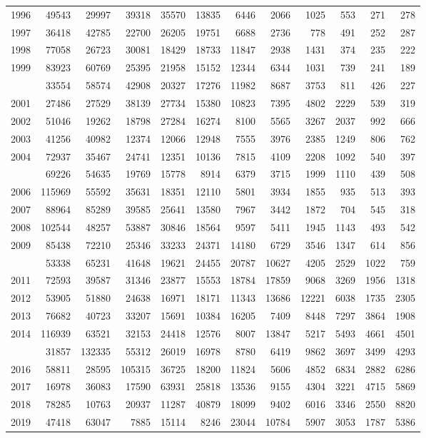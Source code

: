 \documentclass[
]{article}
\begin{document}
\begin{longtable}[t]{lrrrrrrrrrrr}
1996 & 49543 & 29997 & 39318 & 35570 & 13835 & 6446 & 2066 & 1025 & 553 & 271 & 278\\
1997 & 36418 & 42785 & 22700 & 26205 & 19751 & 6688 & 2736 & 778 & 491 & 252 & 287\\
1998 & 77058 & 26723 & 30081 & 18429 & 18733 & 11847 & 2938 & 1431 & 374 & 235 & 222\\
1999 & 83923 & 60769 & 25395 & 21958 & 15152 & 12344 & 6344 & 1031 & 739 & 241 & 189\\
\addlinespace
2000 & 33554 & 58574 & 42908 & 20327 & 17276 & 11982 & 8687 & 3753 & 811 & 426 & 227\\
2001 & 27486 & 27529 & 38139 & 27734 & 15380 & 10823 & 7395 & 4802 & 2229 & 539 & 319\\
2002 & 51046 & 19262 & 18798 & 27284 & 16274 & 8100 & 5565 & 3267 & 2037 & 992 & 666\\
2003 & 41256 & 40982 & 12374 & 12066 & 12948 & 7555 & 3976 & 2385 & 1249 & 806 & 762\\
2004 & 72937 & 35467 & 24741 & 12351 & 10136 & 7815 & 4109 & 2208 & 1092 & 540 & 397\\
\addlinespace
2005 & 69226 & 54635 & 19769 & 15778 & 8914 & 6379 & 3715 & 1999 & 1110 & 439 & 508\\
2006 & 115969 & 55592 & 35631 & 18351 & 12110 & 5801 & 3934 & 1855 & 935 & 513 & 393\\
2007 & 88964 & 85289 & 39585 & 25641 & 13580 & 7967 & 3442 & 1872 & 704 & 545 & 318\\
2008 & 102544 & 48257 & 53887 & 30846 & 18564 & 9597 & 5411 & 1945 & 1143 & 493 & 542\\
2009 & 85438 & 72210 & 25346 & 33233 & 24371 & 14180 & 6729 & 3546 & 1347 & 614 & 856\\
\addlinespace
2010 & 53338 & 65231 & 41648 & 19621 & 24455 & 20787 & 10627 & 4205 & 2529 & 1022 & 759\\
2011 & 72593 & 39587 & 31346 & 23877 & 15553 & 18784 & 17859 & 9068 & 3269 & 1956 & 1318\\
2012 & 53905 & 51880 & 24638 & 16971 & 18171 & 11343 & 13686 & 12221 & 6038 & 1735 & 2305\\
2013 & 76682 & 40723 & 33207 & 15691 & 10384 & 16205 & 7409 & 8448 & 7297 & 3864 & 1908\\
2014 & 116939 & 63521 & 32153 & 24418 & 12576 & 8007 & 13847 & 5217 & 5493 & 4661 & 4501\\
\addlinespace
2015 & 31857 & 132335 & 55312 & 26019 & 16978 & 8780 & 6419 & 9862 & 3697 & 3499 & 4293\\
2016 & 58811 & 28595 & 105315 & 36725 & 18200 & 11824 & 5606 & 4852 & 6834 & 2882 & 6286\\
2017 & 16978 & 36083 & 17590 & 63931 & 25818 & 13536 & 9155 & 4304 & 3221 & 4715 & 5869\\
2018 & 78285 & 10763 & 20937 & 11287 & 40879 & 18099 & 9402 & 6016 & 3346 & 2550 & 8820\\
2019 & 47418 & 63047 & 7885 & 15114 & 8246 & 23044 & 10784 & 5907 & 3053 & 1787 & 5386\\*
\end{longtable}
\end{document}
